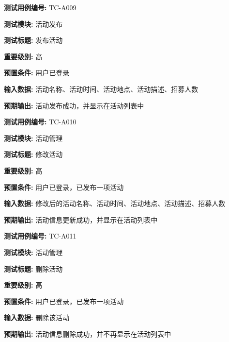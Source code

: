 \begin{framed} \textbf{测试用例编号:} TC-A009

\textbf{测试模块:} 活动发布

\textbf{测试标题:} 发布活动

\textbf{重要级别:} 高

\textbf{预置条件:} 用户已登录

\textbf{输入数据:} 活动名称、活动时间、活动地点、活动描述、招募人数

\textbf{预期输出:} 活动发布成功，并显示在活动列表中

\begin{center}  \end{center} \end{framed}

\begin{framed} \textbf{测试用例编号:} TC-A010

\textbf{测试模块:} 活动管理

\textbf{测试标题:} 修改活动

\textbf{重要级别:} 高

\textbf{预置条件:} 用户已登录，已发布一项活动

\textbf{输入数据:} 修改后的活动名称、活动时间、活动地点、活动描述、招募人数

\textbf{预期输出:} 活动信息更新成功，并显示在活动列表中

\begin{center}  \end{center} \end{framed}

\begin{framed} \textbf{测试用例编号:} TC-A011

\textbf{测试模块:} 活动管理

\textbf{测试标题:} 删除活动

\textbf{重要级别:} 高

\textbf{预置条件:} 用户已登录，已发布一项活动

\textbf{输入数据:} 删除该活动

\textbf{预期输出:} 活动信息删除成功，并不再显示在活动列表中

\begin{center}  \end{center} \end{framed}

